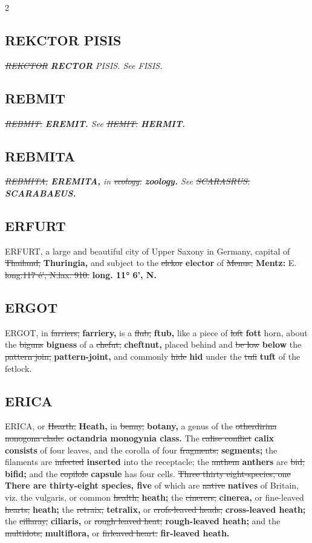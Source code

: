\documentclass[10pt]{article}
\begin{document}
\begin{multicols}{2}
\subsection*{REKCTOR PISIS}
\textit{\sout{REKCTOR} \textbf{RECTOR} PISIS. See FISIS.}

\subsection*{REBMIT}
\textit{\sout{REBMIT.} \textbf{EREMIT.} See \sout{HEMIT.} \textbf{HERMIT.}}

\subsection*{REBMITA}
\textit{\sout{REBMITA,} \textbf{EREMITA,} in \sout{ecology.} \textbf{zoology.} See \sout{SCARASRUS.} \textbf{SCARABAEUS.}}

\subsection*{ERFURT}
ERFURT, a large and beautiful city of Upper Saxony in Germany, capital of \sout{Thailand,} \textbf{Thuringia,} and subject to the \sout{elckor} \textbf{elector} of \sout{Menus;} \textbf{Mentz:} E. \sout{long.117 é', N.lax. 910.} \textbf{long. 11° 6', N.}

\subsection*{ERGOT}
ERGOT, in \sout{farriers,} \textbf{farriery,} is a \sout{flub,} \textbf{ftub,} like a piece of \sout{loft} \textbf{fott} horn, about the \sout{biguns} \textbf{bigness} of a \sout{chefut,} \textbf{cheftnut,} placed behind and \sout{be low} \textbf{below} the \sout{pattern join,} \textbf{pattern-joint,} and commonly \sout{hide} \textbf{hid} under the \sout{tufi} \textbf{tuft} of the fetlock.

\subsection*{ERICA}
ERICA, or \sout{Hearth,} \textbf{Heath,} in \sout{benny,} \textbf{botany,} a genus of the \sout{otherdirina nonogona clade.} \textbf{octandria monogynia class.} The \sout{calise conflict} \textbf{calix consists} of four leaves, and the corolla of four \sout{fragments;} \textbf{segments;} the filaments are \sout{infected} \textbf{inserted} into the receptacle; the \sout{anthem} \textbf{anthers} are \sout{bid;} \textbf{bifid;} and the \sout{copilole} \textbf{capsule} has four cells. \sout{Three thirty eight-species, one} \textbf{There are thirty-eight species, five} of which are \sout{native} \textbf{natives} of Britain, viz. the vulgaris, or common \sout{health;} \textbf{heath;} the \sout{cinerers,} \textbf{cinerea,} or fine-leaved \sout{hearts;} \textbf{heath;} the \sout{retraix,} \textbf{tetralix,} or \sout{crofs-leaved heads;} \textbf{cross-leaved heath;} the \sout{cillaray,} \textbf{ciliaris,} or \sout{rough leaved heat;} \textbf{rough-leaved heath;} and the \sout{multidots,} \textbf{multiflora,} or \sout{firleaved heart.} \textbf{fir-leaved heath.}


\end{multicols}
\end{document}
